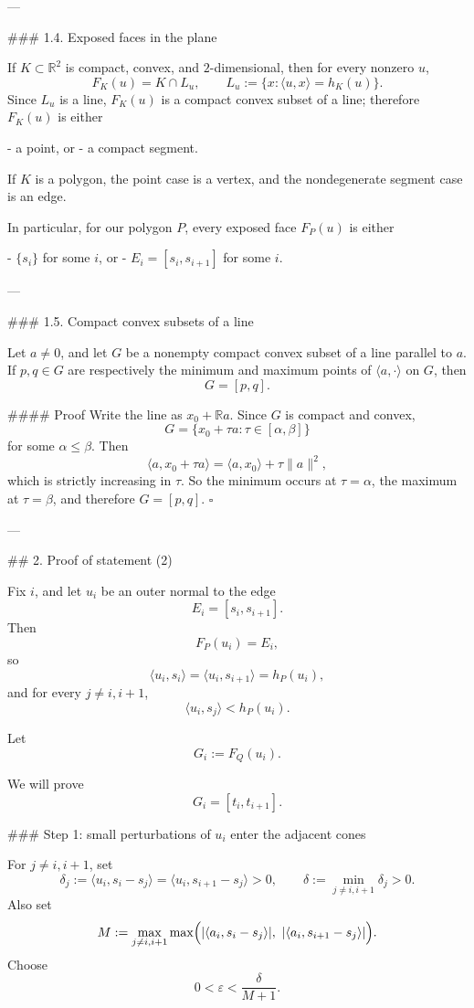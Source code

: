 ---

### 1.4. Exposed faces in the plane

If \(K\subset \mathbb R^2\) is compact, convex, and \(2\)-dimensional, then for every nonzero \(u\),
\[
F_K(u)=K\cap L_u,\qquad L_u:=\{x:\langle u,x\rangle=h_K(u)\}.
\]
Since \(L_u\) is a line, \(F_K(u)\) is a compact convex subset of a line; therefore \(F_K(u)\) is either

- a point, or
- a compact segment.

If \(K\) is a polygon, the point case is a vertex, and the nondegenerate segment case is an edge.

In particular, for our polygon \(P\), every exposed face \(F_P(u)\) is either

- \(\{s_i\}\) for some \(i\), or
- \(E_i=[s_i,s_{i+1}]\) for some \(i\).

---

### 1.5. Compact convex subsets of a line

Let \(a\neq 0\), and let \(G\) be a nonempty compact convex subset of a line parallel to \(a\). If \(p,q\in G\) are respectively the minimum and maximum points of \(\langle a,\cdot\rangle\) on \(G\), then
\[
G=[p,q].
\]

#### Proof
Write the line as \(x_0+\mathbb Ra\). Since \(G\) is compact and convex,
\[
G=\{x_0+\tau a:\tau\in[\alpha,\beta]\}
\]
for some \(\alpha\le \beta\). Then
\[
\langle a,x_0+\tau a\rangle=\langle a,x_0\rangle+\tau\|a\|^2,
\]
which is strictly increasing in \(\tau\). So the minimum occurs at \(\tau=\alpha\), the maximum at \(\tau=\beta\), and therefore \(G=[p,q]\).
\(\square\)

---

## 2. Proof of statement (2)

Fix \(i\), and let \(u_i\) be an outer normal to the edge
\[
E_i=[s_i,s_{i+1}].
\]
Then
\[
F_P(u_i)=E_i,
\]
so
\[
\langle u_i,s_i\rangle=\langle u_i,s_{i+1}\rangle=h_P(u_i),
\]
and for every \(j\neq i,i+1\),
\[
\langle u_i,s_j\rangle<h_P(u_i).
\]

Let
\[
G_i:=F_Q(u_i).
\]

We will prove
\[
G_i=[t_i,t_{i+1}].
\]

### Step 1: small perturbations of \(u_i\) enter the adjacent cones

For \(j\neq i,i+1\), set
\[
\delta_j:=\langle u_i,s_i-s_j\rangle=\langle u_i,s_{i+1}-s_j\rangle>0,
\qquad
\delta:=\min_{j\neq i,i+1}\delta_j>0.
\]
Also set
\[
M:=\max_{j\neq i,i+1}\max\Bigl(
|\langle a_i,s_i-s_j\rangle|,\ |\langle a_i,s_{i+1}-s_j\rangle|
\Bigr).
\]
Choose
\[
0<\varepsilon<\frac{\delta}{M+1}.
\]


